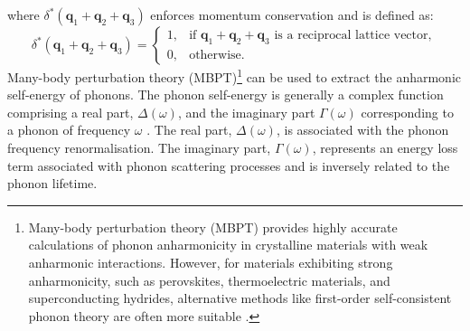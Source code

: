 where $\delta^{\ast}(\mathbf{q}_{1} + \mathbf{q}_{2} + \mathbf{q}_{3})$ enforces momentum conservation and is defined as:
\begin{equation}
\label{equ:2.20}
\delta^{\ast}(\mathbf{q}_{1} + \mathbf{q}_{2} + \mathbf{q}_{3}) =
\begin{cases} 
1, & \text{if } \mathbf{q}_{1} + \mathbf{q}_{2} + \mathbf{q}_{3} \text{ is a reciprocal lattice vector}, \\
0, & \text{otherwise}.
\end{cases}
\end{equation}
Many-body perturbation theory (MBPT)\footnote{Many-body perturbation theory (MBPT) provides highly accurate calculations of phonon anharmonicity in crystalline materials with weak anharmonic interactions. However, for materials exhibiting strong anharmonicity, such as perovskites, thermoelectric materials, and superconducting hydrides, alternative methods like first-order self-consistent phonon theory are often more suitable \cite{Tadano2018}.} 
can be used to extract the anharmonic self-energy of phonons.
The phonon self-energy is generally a complex function comprising a real part, $\Delta(\omega)$, and the imaginary part $\Gamma(\omega)$ corresponding to a phonon of frequency $\omega$ \cite{R.A.Cowley}.
The real part, $\Delta(\omega)$, is associated with the phonon frequency renormalisation. The imaginary part, $\Gamma(\omega)$, represents an energy loss term associated with phonon scattering processes and is inversely related to the phonon lifetime.

